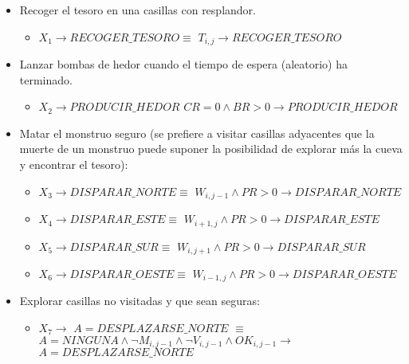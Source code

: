 \begin{itemize}
    \item Recoger el tesoro en una casillas con resplandor.
        \begin{itemize}
            \item   $X_1 \longrightarrow RECOGER\_TESORO \equiv$
                    \newline
                    $T_{i, j} \longrightarrow RECOGER\_TESORO$
        \end{itemize}
        
    \item Lanzar bombas de hedor cuando el tiempo de espera (aleatorio) ha terminado.
        \begin{itemize}
            \item $X_2 \longrightarrow PRODUCIR\_HEDOR$
            \newline
            $CR = 0 \land BR > 0 \longrightarrow PRODUCIR\_HEDOR$
        \end{itemize}
    
    \item Matar el monstruo seguro (se prefiere a visitar casillas adyacentes que la muerte de un monstruo puede suponer la posibilidad de explorar más la cueva y encontrar el tesoro): 
        \begin{itemize}
            \item   $X_3 \longrightarrow DISPARAR\_NORTE \equiv$
                    \newline
                    $W_{i, j-1} \land PR > 0 \longrightarrow DISPARAR\_NORTE$
            \item   $X_4 \longrightarrow DISPARAR\_ESTE \equiv$
                    \newline
                    $W_{i+1, j} \land PR > 0 \longrightarrow DISPARAR\_ESTE$
            \item   $X_5 \longrightarrow DISPARAR\_SUR \equiv$
                    \newline
                    $W_{i, j+1} \land PR > 0 \longrightarrow DISPARAR\_SUR$
            \item   $X_6 \longrightarrow DISPARAR\_OESTE \equiv$
                    \newline
                    $W_{i-1, j} \land PR > 0 \longrightarrow DISPARAR\_OESTE$
        \end{itemize}
    
    \item Explorar casillas no visitadas y que sean seguras:
        \begin{itemize}
            \item   $ X_7                 \longrightarrow$
                    $A = DESPLAZARSE\_NORTE $
                    $\equiv$
                    \newline
                    $ A = NINGUNA \land \neg M_{i, j-1} \land \neg V_{i, j-1} \land OK_{i, j-1} \longrightarrow$
                    \newline
                    $A = DESPLAZARSE\_NORTE$
            

\end{itemize}
\end{itemize}
